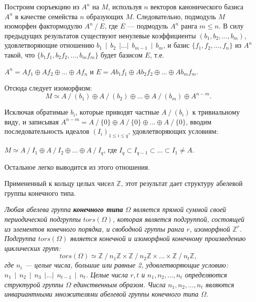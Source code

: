 \newpage
\begin{myproof}
Построим сюръекцию из $A^{n}$ на $M$, используя $n$ векторов канонического базиса $A^{n}$ в качестве семейства $n$ образующих $M$. Следовательно, подмодуль $M$ изоморфен фактормодулю $A^{n} ~/~ E$, где $E$ — подмодуль $A^{n}$ ранга $ m \leqslant n$. В силу предыдущих результатов существуют ненулевые коэффициенты $(b_1, b_2, ..., b_m)$, удовлетворяющие отношению $b_1~~|~~b_2~~|...|~~b_{m-1}~~|~~b_m$, и базис $\{f_1, f_2, ..., f_n\}$ из $A^{n}$ такой, что $\{b_1f_1, b_2f_2,...,b_mf_m\}$ будет базисом $E$, т.е.
\begin{center}
$A^{n} = Af_1 \oplus Af_2 \oplus ... \oplus Af_n$ и $ E = Ab_1f_1 \oplus Ab_2f_2 \oplus ... \oplus Ab_mf_m.$
\end{center}

\noindent Отсюда следует изоморфизм:
$$ M \simeq A ~/~(b_1) \oplus A ~/~(b_2) \oplus ... \oplus A ~/~(b_m) \oplus A^{n-m}. $$

\noindent Исключая обратимые $b_i$, которые приводят частные $A ~/~(b_i)$ к тривиальному виду, и записывая $A^{n-m} = A ~/~ \{0\} \oplus A ~/~ \{0\} \oplus ... \oplus A ~/~ \{0\}$, вводим последовательность идеалов $(I_i)_{1\leqslant i \leqslant q}$, удовлетворяющих условиям:
\begin{center}
$ M \simeq A ~/~ I_1 \oplus A ~/~ I_2 \oplus ... \oplus A ~/~ I_q $, 
где $I_q \subset I_{q-1} \subset ... \subset I_1 \ne A$.
\end{center}

\noindent Остальное легко выводится из этого отношения.
\end{myproof}
Примененный к кольцу целых чисел $\mathbb{Z}$, этот результат дает структуру абелевой группы конечного типа.
\begin{predl}
\hspace*{0.5cm}

\textit{Любая абелева группа \textbf{конечного типа} $\Omega$ является прямой суммой своей периодической подгруппы $tors(\Omega)$, которая является подгруппой, состоящей из элементов конечного порядка, и свободной группы ранга $r$, изоморфной $\mathbb{Z}^r$. Подгруппа $tors(\Omega)$ является конечной и изоморфной конечному произведению циклических групп:}
$$tors(\Omega) \simeq \mathbb{Z} ~/~n_1 \mathbb{Z} \times \mathbb{Z} ~/~n_2 \mathbb{Z} \times ... \times \mathbb{Z} ~/~n_t \mathbb{Z},$$
\noindent \textit{ где $n_i$ — целые числа, большие или равные 2, удовлетворяющие условию: $n_1~~|~~n_2~~|~~n_3~~|...|~~n_{t-1}~~|~~n_t$. Целые числа $r, t$ и $n_1, n_2, ..., n_t$ определяются структурой группы $\Omega$ единственным образом. Числа $n_1, n_2, ..., n_t$ являются инвариантными множителями абелевой группы конечного типа $\Omega$.}
\end{predl}

